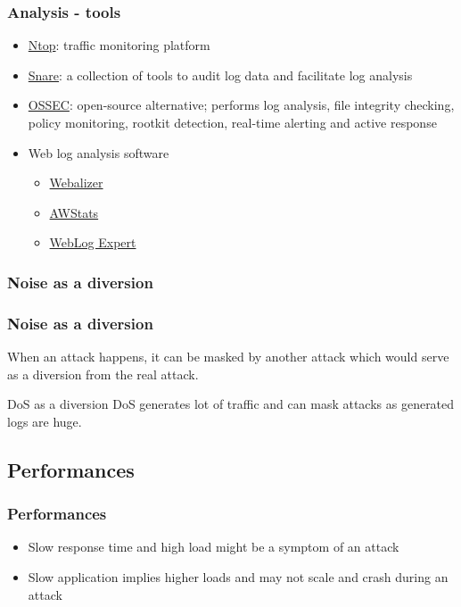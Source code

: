 \begin{frame}
\frametitle{Analysis - tools}
\begin{itemize}
\item \href{http://www.ntop.org/products/ntop/}{Ntop}: traffic monitoring
platform
\item \href{http://www.intersectalliance.com}{Snare}: a collection of tools to
audit log data and facilitate log analysis
\item \href{http://www.ossec.net/}{OSSEC}: open-source alternative; performs
log analysis, file integrity checking, policy monitoring, rootkit detection,
real-time alerting and active response
\item Web log analysis software
	\begin{itemize}
	\item \href{http://www.webalizer.org/}{Webalizer}
	\item \href{http://awstats.sourceforge.net/}{AWStats}
	\item \href{http://www.weblogexpert.com/}{WebLog Expert}
	\end{itemize}
\end{itemize}
\end{frame}

\subsubsection{Noise as a diversion}

\begin{frame}
\frametitle{Noise as a diversion}
When an attack happens, it can be masked by another attack which would serve
as a diversion from the real attack.
\begin{exampleblock}{DoS as a diversion}
DoS generates lot of traffic and can mask attacks as generated logs are huge.
\end{exampleblock}
\end{frame}

\subsection{Performances}

\begin{frame}
\frametitle{Performances}
\begin{itemize}
\item Slow response time and high load might be a symptom of an attack
\item Slow application implies higher loads and may not scale and crash during
	an attack
\end{itemize}
\end{frame}

